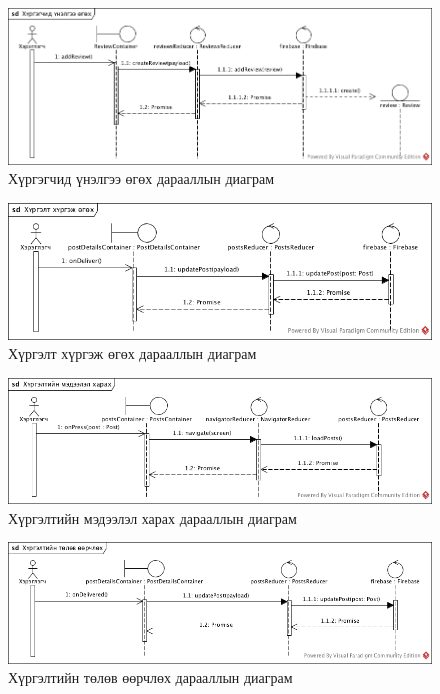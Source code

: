 \begin{figure}[H]
	\centering
	\includegraphics[width=\textwidth]{Figures/zohiomj/seq/hurgegchid_unelgee_ogoh.jpg}
	\caption{Хүргэгчид үнэлгээ өгөх дарааллын диаграм}
\end{figure}

\begin{figure}[H]
	\centering
	\includegraphics[width=\textwidth]{Figures/zohiomj/seq/hurgelt_hurgej_ogoh.jpg}
	\caption{Хүргэлт хүргэж өгөх дарааллын диаграм}
\end{figure}

\begin{figure}[H]
	\centering
	\includegraphics[width=\textwidth]{Figures/zohiomj/seq/hurgeltiin_medeelel_harah.jpg}
	\caption{Хүргэлтийн мэдээлэл харах дарааллын диаграм}
\end{figure}

\begin{figure}[H]
	\centering
	\includegraphics[width=\textwidth]{Figures/zohiomj/seq/hurgeltiin_tolov_oorchloh.jpg}
	\caption{Хүргэлтийн төлөв өөрчлөх дарааллын диаграм}
\end{figure}

